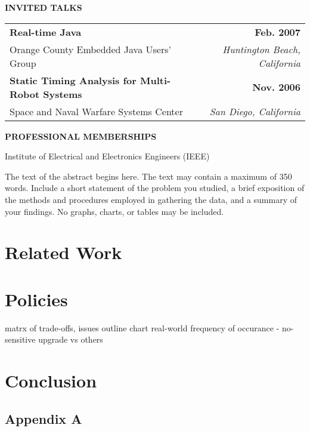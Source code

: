 \documentclass[12pt,fleqn]{ucithesis}
\begin{document}
{	\vspace{12pt}
	\textbf{INVITED TALKS}

	\begin{tabular*}{1\textwidth}{@{\extracolsep{\fill}}lr}
		\textbf{Real-time Java} & \textbf{Feb. 2007} \\
		\vspace{6pt}
		Orange County Embedded Java Users' Group & \emph{Huntington Beach, California} \\
		\textbf{Static Timing Analysis for Multi-Robot Systems} & \textbf{Nov. 2006} \\
		Space and Naval Warfare Systems Center & \emph{San Diego, California} \\
	\end{tabular*}

	\vspace{12pt}
	\textbf{PROFESSIONAL MEMBERSHIPS}

	Institute of Electrical and Electronics Engineers (IEEE)
}

\thesisabstract
{
	The text of the abstract begins here. The text may contain a maximum of 350 words. Include a short statement of the 
problem you studied, a brief exposition of the methods and procedures employed in gathering the data, and a summary of your 
findings. No graphs, charts, or tables may be included.
}

\preliminarypages



\chapter{Related Work}





\chapter{Policies}
  matrx of trade-offs, issues
  outline chart
  real-world frequency of occurance
  - no-sensitive upgrade vs others
\chapter{Conclusion}

\clearpage
{}




\appendix
\section{Appendix A}
\end{document}

